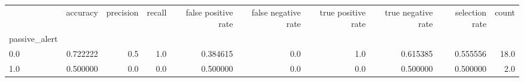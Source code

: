 \begin{tabular}{lrrrrrrrrr}
\toprule
{} &  accuracy &  precision &  recall &  false positive rate &  false negative rate &  true positive rate &  true negative rate &  selection rate &  count \\
passive\_alert &           &            &         &                      &                      &                     &                     &                 &        \\
\midrule
0.0           &  0.722222 &        0.5 &     1.0 &             0.384615 &                  0.0 &                 1.0 &            0.615385 &        0.555556 &   18.0 \\
1.0           &  0.500000 &        0.0 &     0.0 &             0.500000 &                  0.0 &                 0.0 &            0.500000 &        0.500000 &    2.0 \\
\bottomrule
\end{tabular}

